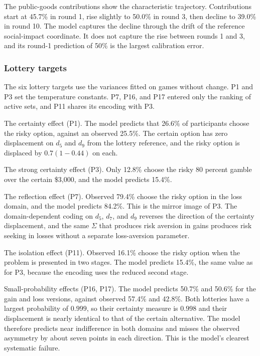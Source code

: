 \documentclass[journal]{IEEEtran}
\begin{document}
The public-goods contributions show the characteristic trajectory.
Contributions start at 45.7\% in round 1, rise slightly to 50.0\% in round 3, then decline to 39.0\% in round 10.
The model captures the decline through the drift of the reference social-impact coordinate.
It does not capture the rise between rounds 1 and 3, and its round-1 prediction of 50\% is the largest calibration error.

\subsubsection{Lottery targets}

The six lottery targets use the variances fitted on games without change.
P1 and P3 set the temperature constants.
P7, P16, and P17 entered only the ranking of active sets, and P11 shares its encoding with P3.

The certainty effect (P1). The model predicts that 26.6\% of participants choose the risky option, against an observed 25.5\%.
The certain option has zero displacement on $d_5$ and $d_9$ from the lottery reference, and the risky option is displaced by $0.7(1-0.44)$ on each.

The strong certainty effect (P3). Only 12.8\% choose the risky 80 percent gamble over the certain \$3,000, and the model predicts 15.4\%.

The reflection effect (P7). Observed 79.4\% choose the risky option in the loss domain, and the model predicts 84.2\%.
This is the mirror image of P3.
The domain-dependent coding on $d_5$, $d_7$, and $d_9$ reverses the direction of the certainty displacement, and the same $\Sigma$ that produces risk aversion in gains produces risk seeking in losses without a separate loss-aversion parameter.

The isolation effect (P11). Observed 16.1\% choose the risky option when the problem is presented in two stages.
The model predicts 15.4\%, the same value as for P3, because the encoding uses the reduced second stage.

Small-probability effects (P16, P17). The model predicts 50.7\% and 50.6\% for the gain and loss versions, against observed 57.4\% and 42.8\%.
Both lotteries have a largest probability of $0.999$, so their certainty measure is $0.998$ and their displacement is nearly identical to that of the certain alternative.
The model therefore predicts near indifference in both domains and misses the observed asymmetry by about seven points in each direction.
This is the model's clearest systematic failure.
\end{document}
